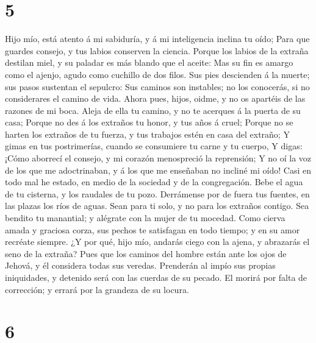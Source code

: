 \hypertarget{section-4}{%
\section{5}\label{section-4}}

 Hijo mío, está atento á mi sabiduría, y á mi inteligencia
inclina tu oído;  Para que guardes consejo, y tus labios
conserven la ciencia.  Porque los labios de la extraña
destilan miel, y su paladar es más blando que el aceite: 
Mas su fin es amargo como el ajenjo, agudo como cuchillo de dos filos.
 Sus pies descienden á la muerte; sus pasos sustentan el
sepulcro:  Sus caminos son instables; no los conocerás, si
no considerares el camino de vida.  Ahora pues, hijos,
oidme, y no os apartéis de las razones de mi boca.  Aleja de
ella tu camino, y no te acerques á la puerta de su casa; 
Porque no des á los extraños tu honor, y tus años á cruel; 
Porque no se harten los extraños de tu fuerza, y tus trabajos estén en
casa del extraño;  Y gimas en tus postrimerías, cuando se
consumiere tu carne y tu cuerpo,  Y digas: ¡Cómo aborrecí
el consejo, y mi corazón menospreció la reprensión;  Y no
oí la voz de los que me adoctrinaban, y á los que me enseñaban no
incliné mi oído!  Casi en todo mal he estado, en medio de
la sociedad y de la congregación.  Bebe el agua de tu
cisterna, y los raudales de tu pozo.  Derrámense por de
fuera tus fuentes, en las plazas los ríos de aguas.  Sean
para ti solo, y no para los extraños contigo.  Sea bendito
tu manantial; y alégrate con la mujer de tu mocedad.  Como
cierva amada y graciosa corza, sus pechos te satisfagan en todo tiempo;
y en su amor recréate siempre.  ¿Y por qué, hijo mío,
andarás ciego con la ajena, y abrazarás el seno de la extraña?
 Pues que los caminos del hombre están ante los ojos de
Jehová, y él considera todas sus veredas.  Prenderán al
impío sus propias iniquidades, y detenido será con las cuerdas de su
pecado.  El morirá por falta de corrección; y errará por la
grandeza de su locura.

\hypertarget{section-5}{%
\section{6}\label{section-5}}

